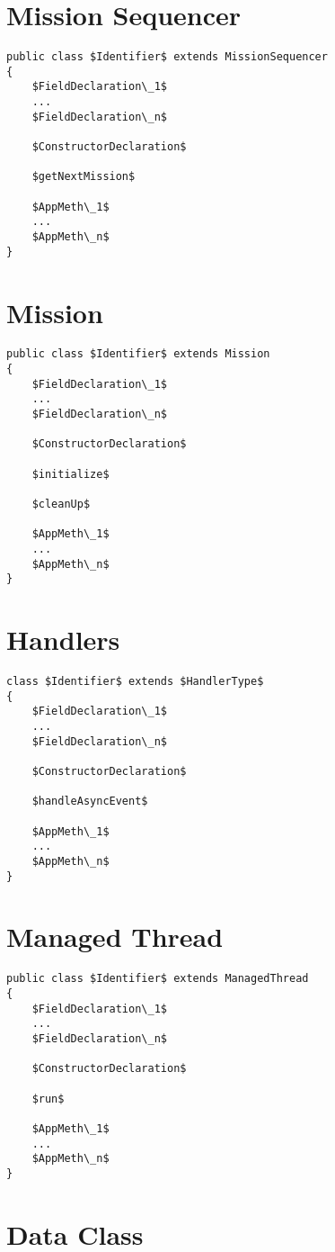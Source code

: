 \documentclass[11pt,a4paper]{article}
\begin{document}


\newpage

\section*{Mission Sequencer}

\begin{lstlisting}
public class $Identifier$ extends MissionSequencer
{
	$FieldDeclaration\_1$
	...
	$FieldDeclaration\_n$

	$ConstructorDeclaration$

	$getNextMission$

	$AppMeth\_1$
	...
	$AppMeth\_n$
}
\end{lstlisting}



\newpage

\section*{Mission}

\begin{lstlisting}
public class $Identifier$ extends Mission
{
	$FieldDeclaration\_1$
	...
	$FieldDeclaration\_n$

	$ConstructorDeclaration$

	$initialize$

	$cleanUp$

	$AppMeth\_1$
	...
	$AppMeth\_n$
}
\end{lstlisting}

\newpage

\section*{Handlers}

\begin{lstlisting}
class $Identifier$ extends $HandlerType$
{
	$FieldDeclaration\_1$
	...
	$FieldDeclaration\_n$

	$ConstructorDeclaration$

	$handleAsyncEvent$

	$AppMeth\_1$
	...
	$AppMeth\_n$
}
\end{lstlisting}

\newpage

\section*{Managed Thread}

\begin{lstlisting}
public class $Identifier$ extends ManagedThread
{
	$FieldDeclaration\_1$
	...
	$FieldDeclaration\_n$

	$ConstructorDeclaration$

	$run$

	$AppMeth\_1$
	...
	$AppMeth\_n$
}
\end{lstlisting}


\section*{Data Class}


\end{document}
